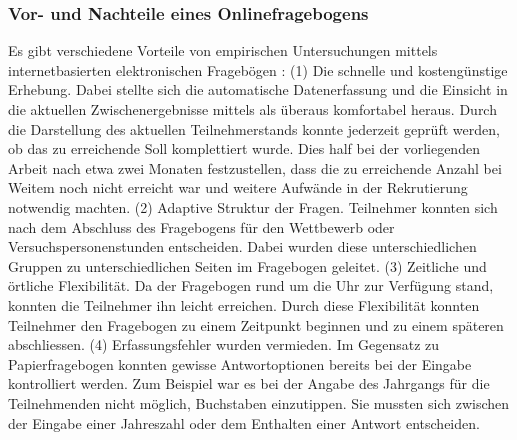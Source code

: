 \subsubsection{Vor- und Nachteile eines Onlinefragebogens}
Es gibt verschiedene Vorteile von empirischen Untersuchungen mittels internetbasierten elektronischen Fragebögen \cite{Rey2009}: (1) Die schnelle und kostengünstige Erhebung. Dabei stellte sich die automatische Datenerfassung und die Einsicht in die aktuellen Zwischenergebnisse mittels  als überaus komfortabel heraus. Durch die Darstellung des aktuellen Teilnehmerstands konnte jederzeit geprüft werden, ob das zu erreichende Soll komplettiert wurde. Dies half bei der vorliegenden Arbeit nach etwa zwei Monaten festzustellen, dass die zu erreichende Anzahl bei Weitem noch nicht erreicht war und weitere Aufwände in der Rekrutierung notwendig machten. (2) Adaptive Struktur der Fragen. Teilnehmer konnten sich nach dem Abschluss des Fragebogens für den Wettbewerb oder Versuchspersonenstunden entscheiden. Dabei wurden diese unterschiedlichen Gruppen zu unterschiedlichen Seiten im Fragebogen geleitet. (3) Zeitliche und örtliche Flexibilität. Da der Fragebogen rund um die Uhr zur Verfügung stand, konnten die Teilnehmer ihn leicht erreichen. Durch diese Flexibilität konnten Teilnehmer den Fragebogen zu einem Zeitpunkt beginnen und zu einem späteren abschliessen. (4) Erfassungsfehler wurden vermieden. Im Gegensatz zu Papierfragebogen konnten gewisse Antwortoptionen bereits bei der Eingabe kontrolliert werden. Zum Beispiel war es bei der Angabe des Jahrgangs für die Teilnehmenden nicht möglich, Buchstaben einzutippen. Sie mussten sich zwischen der Eingabe einer Jahreszahl oder dem Enthalten einer Antwort entscheiden. 

